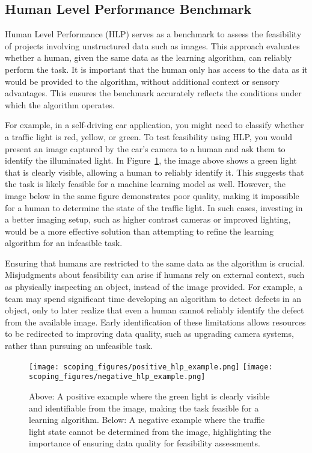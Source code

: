 \documentclass[12pt,openany, draft]{book}
\begin{document}
\subsection{Human Level Performance Benchmark}

Human Level Performance (HLP) serves as a benchmark to assess the feasibility of projects involving unstructured data such as images. This approach evaluates whether a human, given the same data as the learning algorithm, can reliably perform the task. It is important that the human only has access to the data as it would be provided to the algorithm, without additional context or sensory advantages. This ensures the benchmark accurately reflects the conditions under which the algorithm operates. \newline

For example, in a self-driving car application, you might need to classify whether a traffic light is red, yellow, or green. To test feasibility using HLP, you would present an image captured by the car's camera to a human and ask them to identify the illuminated light. In Figure~\ref{fig:hlp_examples}, the image above shows a green light that is clearly visible, allowing a human to reliably identify it. This suggests that the task is likely feasible for a machine learning model as well. However, the image below in the same figure demonstrates poor quality, making it impossible for a human to determine the state of the traffic light. In such cases, investing in a better imaging setup, such as higher contrast cameras or improved lighting, would be a more effective solution than attempting to refine the learning algorithm for an infeasible task. \newline


Ensuring that humans are restricted to the same data as the algorithm is crucial. Misjudgments about feasibility can arise if humans rely on external context, such as physically inspecting an object, instead of the image provided. For example, a team may spend significant time developing an algorithm to detect defects in an object, only to later realize that even a human cannot reliably identify the defect from the available image. Early identification of these limitations allows resources to be redirected to improving data quality, such as upgrading camera systems, rather than pursuing an unfeasible task. \newline

\begin{figure}[H]
    \centering
    \texttt{[image: scoping\_figures/positive\_hlp\_example.png]}
    \vspace{0.5cm} %
    \texttt{[image: scoping\_figures/negative\_hlp\_example.png]}
    \caption{Above: A positive example where the green light is clearly visible and identifiable from the image, making the task feasible for a learning algorithm. Below: A negative example where the traffic light state cannot be determined from the image, highlighting the importance of ensuring data quality for feasibility assessments.}
    \label{fig:hlp_examples}
\end{figure}
\end{document}
